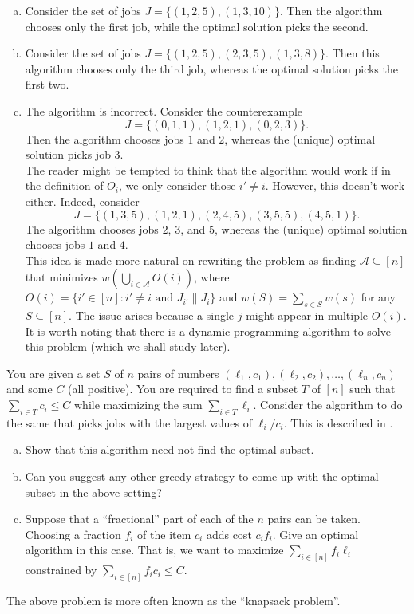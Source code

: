	\begin{solution*}
		\begin{enumerate}[(a)]
			\item Consider the set of jobs $J=\{(1,2,5),(1,3,10)\}$. Then the algorithm chooses only the first job, while the optimal solution picks the second.
			
			\item Consider the set of jobs $J=\{(1,2,5),(2,3,5),(1,3,8)\}$. Then this algorithm chooses only the third job, whereas the optimal solution picks the first two.
			
			\item The algorithm is incorrect. Consider the counterexample
			\[ J = \{(0,1,1),(1,2,1),(0,2,3)\}. \]
			Then the algorithm chooses jobs $1$ and $2$, whereas the (unique) optimal solution picks job $3$.\\
			The reader might be tempted to think that the algorithm would work if in the definition of $O_i$, we only consider those $i'\neq i$. However, this doesn't work either. Indeed, consider
			\[ J = \{(1,3,5),(1,2,1),(2,4,5),(3,5,5),(4,5,1)\}. \]
			The algorithm chooses jobs $2$, $3$, and $5$, whereas the (unique) optimal solution chooses jobs $1$ and $4$.\\
			This idea is made more natural on rewriting the problem as finding $\mathcal{A}\subseteq[n]$ that minimizes $w\left(\bigcup_{i\in\mathcal{A}} O(i)\right)$,	where $O(i) = \{i'\in[n] : i'\neq i\text{ and }J_{i'}\|J_i\}$ and $w(S)=\sum_{s\in S}w(s)$ for any $S\subseteq[n]$. The issue arises because a single $j$ might appear in multiple $O(i)$. It is worth noting that there is a dynamic programming algorithm to solve this problem (which we shall study later).
		\end{enumerate}
	\end{solution*}

	\begin{exercise}
		You are given a set $S$ of $n$ pairs of numbers $(\ell_1,c_1),(\ell_2,c_2),\ldots,(\ell_n,c_n)$ and some $C$ (all positive). You are required to find a subset $T$ of $[n]$ such that $\sum_{i\in T} c_i \leq C$ while maximizing the sum $\sum_{i\in T}\ell_i$. Consider the algorithm to do the same that picks jobs with the largest values of $\ell_i/c_i$. This is described in .
		\begin{enumerate}[(a)]
			\item Show that this algorithm need not find the optimal subset.
			\item Can you suggest any other greedy strategy to come up with the optimal subset in the above setting?
			\item Suppose that a ``fractional'' part of each of the $n$ pairs can be taken. Choosing a fraction $f_i$ of the item $c_i$ adds cost $c_i f_i$. Give an optimal algorithm in this case. That is, we want to maximize $\sum_{i\in [n]} f_i \ell_i$ constrained by $\sum_{i\in[n]} f_i c_i \leq C$.
		\end{enumerate}
		The above problem is more often known as the ``knapsack problem''.
	\end{exercise}

